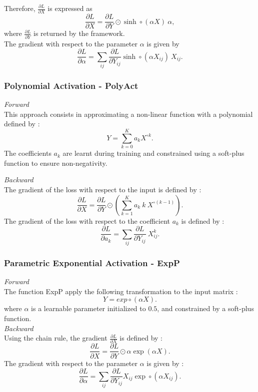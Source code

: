 \documentclass[11pt,a4paper]{article}
\begin{document}
\noindent Therefore, $\frac{\partial L}{ \partial X}$ is expressed as  \[ \frac{\partial L}{ \partial X}=  \frac{\partial L}{\partial Y} \odot \sinh \circ(\alpha X) \: \alpha ,  \] where $\frac{\partial L}{\partial Y}$ is returned by the framework. \\
The gradient with respect to the parameter $\alpha$ is given by \[ \frac{\partial L}{\partial \alpha} = \sum_{ij} \frac{\partial L}{\partial Y_{ij}}  \sinh \circ (\alpha X_{ij} )\: X_{ij}.\]


\subsubsection{Polynomial Activation - PolyAct} 
\noindent \textit{Forward}\\
This approach consists in approximating a non-linear function with a polynomial defined by : \[ Y = \sum_{k=0}^K a_k X^{\circ k} .\]
The coefficients $a_k$ are learnt during training and constrained using a soft-plus function to ensure non-negativity.

\noindent \textit{Backward}\\
The gradient of the loss with respect to the input is defined by : \[\frac{\partial L}{\partial X} = \frac{\partial L}{\partial Y} \odot \left( \sum_{k=1}^Ka_k\: k\: X^{\circ (k-1)}\right).\]
The gradient of the loss with respect to the coefficient $a_k$ is defined by : \[ \frac{\partial L}{\partial a_k} = \sum_{ij} \frac{\partial L}{\partial Y_{ij}} \: X^k_{ij}. \]

\subsubsection{Parametric Exponential Activation - ExpP}
\noindent \textit{Forward}\\
The function ExpP apply the following transformation to the input matrix : \[ Y = exp\circ (\alpha X).\] where $\alpha$ is a learnable parameter initialized to $0.5$, and constrained by a soft-plus function. \\

\noindent \textit{Backward}\\
Using the chain rule, the gradient $\frac{\partial L}{ \partial X}$ is defined by : \[ \frac{\partial L}{\partial X} = \frac{\partial L}{\partial Y} \odot \alpha \exp(\alpha X).\]
The gradient with respect to the parameter $\alpha$ is given by : \[ \frac{\partial L}{\partial \alpha} = \sum_{ij}\frac{\partial L}{\partial Y_{ij}}  X_{ij}\exp\circ(\alpha X_{ij}).\]
\end{document}
